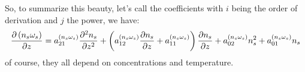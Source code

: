 So, to summarize this beauty, let's call the coefficients  with
$i$ being the order of derivation and $j$ the power, we have:
\begin{equation}
\frac{\partial\left(n_s\omega_s\right)}{\partial z} = a^{(n_s\omega_s)}_{21} \frac{\partial^2n_s}{\partial{z}^2}
                            + \left(a^{(n_s\omega_s)}_{12} \frac{\partial n_s}{\partial z} + a^{(n_s\omega_s)}_{11}\right)\frac{\partial n_s}{\partial z}
                            + a^{(n_s\omega_s)}_{02} n_s^2
                            + a^{(n_s\omega_s)}_{01} n_s
\label{Titan:diff_final_der}
\end{equation}
of course, they all depend on concentrations and temperature.
